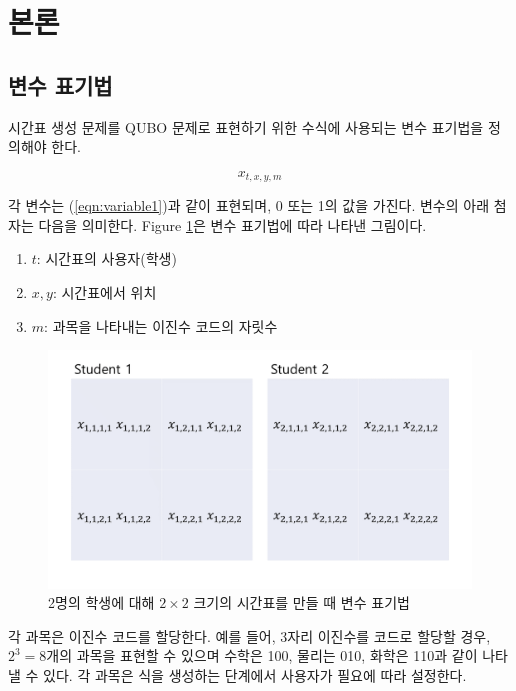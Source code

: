 \documentclass[12pt,a4paper]{article}
\begin{document}
\section{본론}\label{sec:main}

\subsection{변수 표기법}

    시간표 생성 문제를 QUBO 문제로 표현하기 위한 수식에 사용되는 변수 표기법을 정의해야 한다.

    \begin{equation}\label{eqn:variable1}
        x_{t,x,y,m}
    \end{equation}

    각 변수는 (\ref{eqn:variable1})과 같이 표현되며, 0 또는 1의 값을 가진다. 변수의 아래 첨자는 다음을 의미한다. Figure \ref{fig:variable}은 변수 표기법에 따라 나타낸 그림이다.

    \begin{enumerate}
        \item [] $t$: 시간표의 사용자(학생)
        \item [] $x,y$: 시간표에서 위치
        \item [] $m$: 과목을 나타내는 이진수 코드의 자릿수
    \end{enumerate}

    \begin{figure}
        \centering
        \includegraphics[width=\columnwidth]{var1.png}
        \caption{2명의 학생에 대해 $2 \times 2$ 크기의 시간표를 만들 때 변수 표기법}
        \label{fig:variable}
    \end{figure}

    각 과목은 이진수 코드를 할당한다. 예를 들어, 3자리 이진수를 코드로 할당할 경우, $2^{3}=8$개의 과목을 표현할 수 있으며 수학은 100, 물리는 010, 화학은 110과 같이 나타낼 수 있다. 각 과목은 식을 생성하는 단계에서 사용자가 필요에 따라 설정한다.
\end{document}
